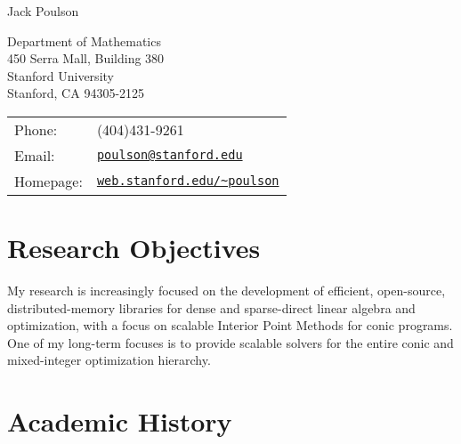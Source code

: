 \documentclass[letterpaper]{article}
\def\name{Jack Poulson}
\begin{document}
{\huge \name}

\vspace{0.25in}

\begin{minipage}{0.45\linewidth}
  Department of Mathematics \\
  450 Serra Mall, Building 380 \\
  Stanford University \\
  Stanford, CA 94305-2125
\end{minipage}
\begin{minipage}{0.45\linewidth}
  \begin{tabular}{ll}
    Phone:&(404)431-9261 \\
    Email:&\href{mailto:poulson@stanford.edu}{\tt poulson@stanford.edu} \\
    Homepage: & \href{http://web.stanford.edu/~poulson}{\tt web.stanford.edu/\textasciitilde poulson} \\
  \end{tabular}
\end{minipage}

\section*{Research Objectives}
My research is increasingly focused on the development of efficient, 
open-source, distributed-memory libraries for dense and sparse-direct 
linear algebra and optimization, with a focus on scalable Interior Point 
Methods for conic programs. One of my long-term focuses is to provide scalable 
solvers for the entire conic and mixed-integer optimization hierarchy. 

\section*{Academic History}
\end{document}
